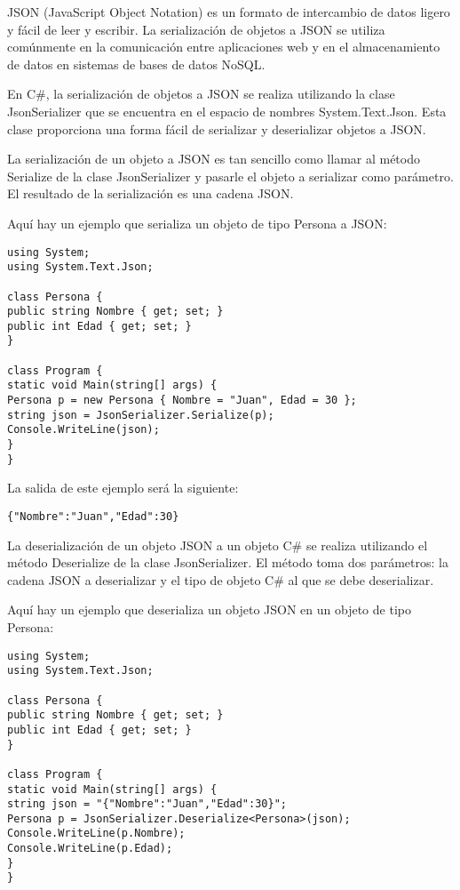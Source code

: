 \documentclass[executivepaper]{article}
\begin{document}
JSON (JavaScript Object Notation) es un formato de intercambio de datos ligero y fácil de leer y escribir. La serialización de objetos a JSON se utiliza comúnmente en la comunicación entre aplicaciones web y en el almacenamiento de datos en sistemas de bases de datos NoSQL.

En C\#, la serialización de objetos a JSON se realiza utilizando la clase JsonSerializer que se encuentra en el espacio de nombres System.Text.Json. Esta clase proporciona una forma fácil de serializar y deserializar objetos a JSON.

La serialización de un objeto a JSON es tan sencillo como llamar al método Serialize de la clase JsonSerializer y pasarle el objeto a serializar como parámetro. El resultado de la serialización es una cadena JSON.

Aquí hay un ejemplo que serializa un objeto de tipo Persona a JSON:

\begin{lstlisting}
using System;
using System.Text.Json;

class Persona {
public string Nombre { get; set; }
public int Edad { get; set; }
}

class Program {
static void Main(string[] args) {
Persona p = new Persona { Nombre = "Juan", Edad = 30 };
string json = JsonSerializer.Serialize(p);
Console.WriteLine(json);
}
}
\end{lstlisting}

La salida de este ejemplo será la siguiente:

\begin{lstlisting}
{"Nombre":"Juan","Edad":30}
\end{lstlisting}

La deserialización de un objeto JSON a un objeto C\# se realiza utilizando el método Deserialize de la clase JsonSerializer. El método toma dos parámetros: la cadena JSON a deserializar y el tipo de objeto C\# al que se debe deserializar.

Aquí hay un ejemplo que deserializa un objeto JSON en un objeto de tipo Persona:

\begin{lstlisting}
using System;
using System.Text.Json;

class Persona {
public string Nombre { get; set; }
public int Edad { get; set; }
}

class Program {
static void Main(string[] args) {
string json = "{"Nombre":"Juan","Edad":30}";
Persona p = JsonSerializer.Deserialize<Persona>(json);
Console.WriteLine(p.Nombre);
Console.WriteLine(p.Edad);
}
}
\end{lstlisting}
\end{document}
